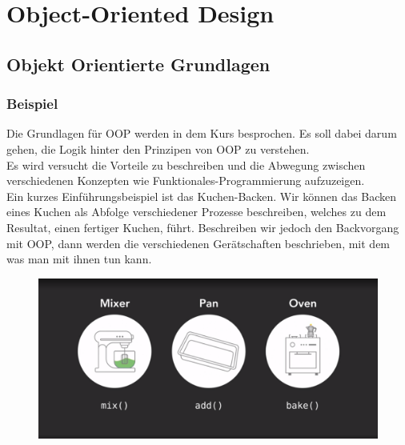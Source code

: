 \section{Object-Oriented Design}
\subsection{Objekt Orientierte Grundlagen}
\subsubsection{Beispiel}
Die Grundlagen für \gls{OOP} werden in dem Kurs besprochen. Es soll dabei darum gehen, die Logik hinter den Prinzipen von \gls{OOP} zu verstehen. \\

Es wird versucht die Vorteile zu beschreiben und die Abwegung zwischen verschiedenen Konzepten wie Funktionales-Programmierung aufzuzeigen. \\

Ein kurzes Einführungsbeispiel ist das Kuchen-Backen. Wir können das Backen eines Kuchen als Abfolge verschiedener Prozesse beschreiben, welches zu dem Resultat, einen fertiger Kuchen, führt. Beschreiben wir jedoch den Backvorgang mit \gls{OOP}, dann werden die verschiedenen Gerätschaften beschrieben, mit dem was man mit ihnen tun kann. 
\begin{figure}[H]
	\centering
	\includegraphics[scale = 0.3]{attachment/chapter_2/Scc002}
	\caption{}
	\label{fig:Scc002}
\end{figure}
